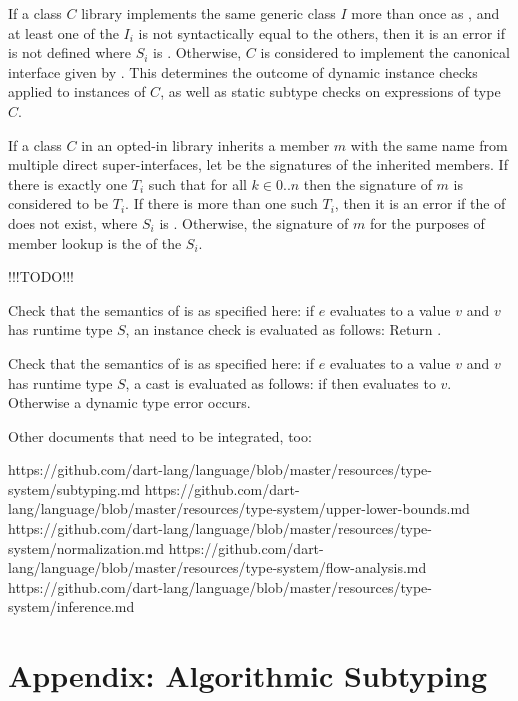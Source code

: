 \documentclass[makeidx]{article}
\begin{document}
{If a class $C$ library implements the same generic class $I$ more
than once as , and at least one of the $I_i$ is not syntactically
equal to the others, then it is an error if  is not
defined where $S_i$ is .  Otherwise, $C$ is considered to
implement the canonical interface given by . This
determines the outcome of dynamic instance checks applied to instances of $C$,
as well as static subtype checks on expressions of type $C$.

If a class $C$ in an opted-in library inherits a member $m$ with the same name
from multiple direct super-interfaces, let
 be the signatures of the inherited members.  If there is exactly one
$T_i$ such that  for all $k \in 0 .. n$ then the signature
of $m$ is considered to be $T_i$.  If there is more than one such $T_i$, then it
is an error if the \TopMergeTypeName{} of  does not exist, where $S_i$
is .  Otherwise, the signature of $m$ for the purposes of member
lookup is the \TopMergeTypeName{} of the $S_i$.

!!!TODO!!!

Check that the semantics of \IS{} is as specified here:
if $e$ evaluates to a value $v$ and $v$ has
runtime type $S$, an instance check  is evaluated as follows:
Return .

Check that the semantics of \AS{} is as specified here:
if $e$ evaluates to a value $v$ and $v$ has
runtime type $S$, a cast  is evaluated as follows:
if  then  evaluates to $v$.
Otherwise a dynamic type error occurs.

Other documents that need to be integrated, too:

https://github.com/dart-lang/language/blob/master/resources/type-system/subtyping.md
https://github.com/dart-lang/language/blob/master/resources/type-system/upper-lower-bounds.md
https://github.com/dart-lang/language/blob/master/resources/type-system/normalization.md
https://github.com/dart-lang/language/blob/master/resources/type-system/flow-analysis.md
https://github.com/dart-lang/language/blob/master/resources/type-system/inference.md

\section*{Appendix: Algorithmic Subtyping}

}
\end{document}
